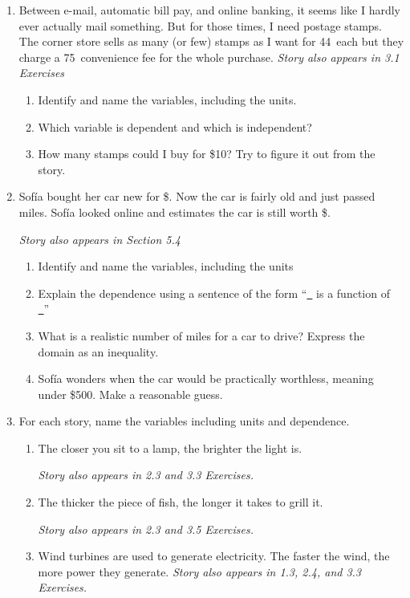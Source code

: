 \begin{enumerate}
\item Between e-mail, automatic bill pay, and online banking, it seems like I hardly ever actually mail something.   But for those times, I need postage stamps. The corner store sells as many (or few) stamps as I want for 44\textcent~each but they charge a 75\textcent~convenience fee for the whole purchase.   \hfill \emph{Story also appears in 3.1 Exercises}
\begin{enumerate}
\item  Identify and name the variables, including the units.
\item Which variable is dependent and which is independent?
\item How many stamps could I buy for \$10?  Try to figure it out from the story.\end{enumerate} 

\item Sof\'ia bought her car new for \$.  Now the car is fairly old and just passed  miles.  Sof\'ia looked online and estimates the car is still worth \$.   

  \hfill \emph{Story also appears in Section 5.4} 
\begin{enumerate}
\item Identify and name the variables, including the units
\item Explain the dependence using a sentence of the form ``\underline{~\quad} is a function of \underline{~\quad}''
\item What is a realistic number of miles for a car to drive?  Express the domain as an inequality.
\item Sof\'ia  wonders when the car would be practically worthless, meaning under \$500.   Make a reasonable guess.
\end{enumerate} 

\item For each story, name the variables including units and dependence.
\begin{enumerate}
\item The closer you sit to a lamp, the brighter the light is. 

\hfill \emph{Story also appears in 2.3 and 3.3 Exercises.}
\item The thicker the piece of fish, the longer it takes to grill it.

\hfill \emph{Story also appears in 2.3 and 3.5 Exercises.}
\item Wind turbines are used to generate electricity.  The faster the wind, the more power they generate. \hfill \emph{Story also appears in 1.3, 2.4, and 3.3 Exercises.}

\end{enumerate}

\end{enumerate}



